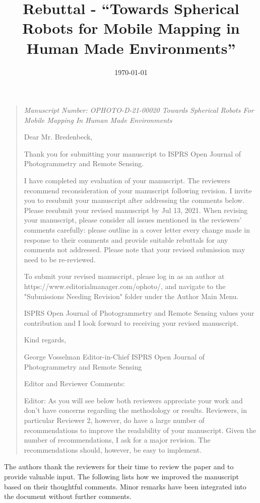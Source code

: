 \documentclass{article}
\title{Rebuttal - ``Towards Spherical Robots for Mobile Mapping in Human Made Environments''}
\date{\today}
\newenvironment{itquote}
  {\begin{quote}\itshape}
  {\end{quote}\ignorespacesafterend}
\begin{document}
\maketitle

\begin{itquote}
Manuscript Number: OPHOTO-D-21-00020 
Towards Spherical Robots For Mobile Mapping In Human Made
Environments

Dear Mr. Bredenbeck, 
 
Thank you for submitting your manuscript to ISPRS Open Journal of
Photogrammetry and Remote Sensing.
 
I have completed my evaluation of your manuscript. The reviewers
recommend reconsideration of your manuscript following revision. I
invite you to resubmit your manuscript after addressing the comments
below. Please resubmit your revised manuscript by Jul 13, 2021. 
When revising your manuscript, please consider all issues mentioned
in the reviewers' comments carefully: please outline in a cover
letter every change made in response to their comments and provide
suitable rebuttals for any comments not addressed. Please note that
your revised submission may need to be re-reviewed.
 
To submit your revised manuscript, please log in as an author at
https://www.editorialmanager.com/ophoto/, and navigate to the
"Submissions Needing Revision" folder under the Author Main Menu.
 
ISPRS Open Journal of Photogrammetry and Remote Sensing values your
contribution and I look forward to receiving your revised
manuscript.
 
Kind regards, 
 
George Vosselman 
Editor-in-Chief 
ISPRS Open Journal of Photogrammetry and Remote Sensing 
  
Editor and Reviewer Comments:
 
Editor:
As you will see below both reviewers appreciate your work and don't
have concerns regarding the methodology or results. Reviewers, in
particular Reviewer 2, however, do have a large number of
recommendations to improve the readability of your manuscript. Given
the number of recommendations, I ask for a major revision. The
recommendations should, however, be easy to implement.
\end{itquote}

The authors thank the reviewers for their time to review the paper and to
provide valuable input. The following lists how we improved the manuscript based
on their thoughtful comments. Minor remarks have been integrated into the
document without further comments.
\end{document}
